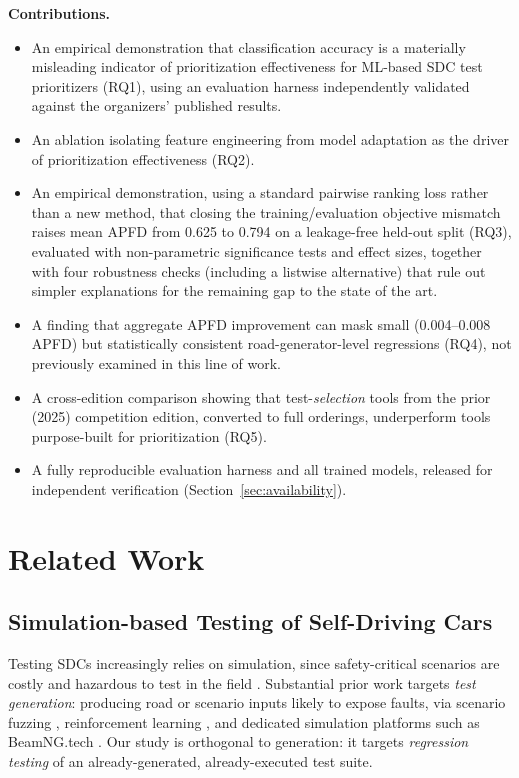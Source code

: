 \documentclass[smallextended]{svjour3}
\begin{document}
\textbf{Contributions.}
\begin{itemize}
\item An empirical demonstration that classification accuracy is a
  materially misleading indicator of prioritization effectiveness for
  ML-based SDC test prioritizers (RQ1), using an evaluation harness
  independently validated against the organizers' published results.
\item An ablation isolating feature engineering from model adaptation as
  the driver of prioritization effectiveness (RQ2).
\item An empirical demonstration, using a standard pairwise ranking loss
  \citep{burges2005learning} rather than a new method, that closing the
  training/evaluation objective mismatch raises mean APFD from 0.625
  to 0.794 on a leakage-free held-out split (RQ3), evaluated with
  non-parametric significance tests and effect sizes, together with four
  robustness checks (including a listwise alternative) that rule out
  simpler explanations for the remaining gap to the state of the art.
\item A finding that aggregate APFD improvement can mask small
  (0.004--0.008 APFD) but statistically consistent road-generator-level
  regressions (RQ4), not previously examined in this line of work.
\item A cross-edition comparison showing that test-\emph{selection} tools
  from the prior (2025) competition edition, converted to full orderings,
  underperform tools purpose-built for prioritization (RQ5).
\item A fully reproducible evaluation harness and all trained models,
  released for independent verification (Section~\ref{sec:availability}).
\end{itemize}

\section{Related Work}
\label{sec:relwork}

\subsection{Simulation-based Testing of Self-Driving Cars}
Testing SDCs increasingly relies on simulation, since safety-critical
scenarios are costly and hazardous to test in the field
\citep{sun2021scenario,ploeg2021scenario}. Substantial prior work targets
\emph{test generation}: producing road or scenario inputs likely to expose
faults, via scenario fuzzing \citep{hu2021coverage}, reinforcement learning
\citep{doreste2024adversarial}, and dedicated simulation platforms such as
BeamNG.tech \citep{papamichail2025scenario}. Our study is orthogonal to
generation: it targets \emph{regression testing} of an already-generated,
already-executed test suite.
\end{document}
